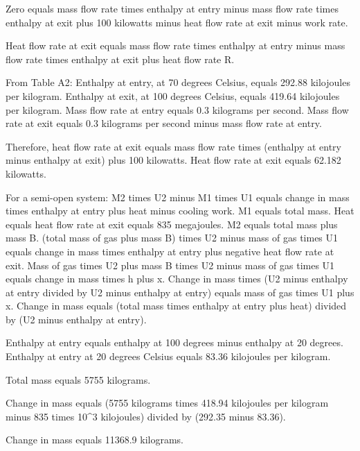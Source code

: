 Zero equals mass flow rate times enthalpy at entry minus mass flow rate times enthalpy at exit plus 100 kilowatts minus heat flow rate at exit minus work rate.

Heat flow rate at exit equals mass flow rate times enthalpy at entry minus mass flow rate times enthalpy at exit plus heat flow rate R.

From Table A2:
Enthalpy at entry, at 70 degrees Celsius, equals 292.88 kilojoules per kilogram.
Enthalpy at exit, at 100 degrees Celsius, equals 419.64 kilojoules per kilogram.
Mass flow rate at entry equals 0.3 kilograms per second.
Mass flow rate at exit equals 0.3 kilograms per second minus mass flow rate at entry.

Therefore, heat flow rate at exit equals mass flow rate times (enthalpy at entry minus enthalpy at exit) plus 100 kilowatts.
Heat flow rate at exit equals 62.182 kilowatts.

For a semi-open system:
M2 times U2 minus M1 times U1 equals change in mass times enthalpy at entry plus heat minus cooling work.
M1 equals total mass.
Heat equals heat flow rate at exit equals 835 megajoules.
M2 equals total mass plus mass B.
(total mass of gas plus mass B) times U2 minus mass of gas times U1 equals change in mass times enthalpy at entry plus negative heat flow rate at exit.
Mass of gas times U2 plus mass B times U2 minus mass of gas times U1 equals change in mass times h plus x.
Change in mass times (U2 minus enthalpy at entry divided by U2 minus enthalpy at entry) equals mass of gas times U1 plus x.
Change in mass equals (total mass times enthalpy at entry plus heat) divided by (U2 minus enthalpy at entry).

Enthalpy at entry equals enthalpy at 100 degrees minus enthalpy at 20 degrees.
Enthalpy at entry at 20 degrees Celsius equals 83.36 kilojoules per kilogram.

Total mass equals 5755 kilograms.

Change in mass equals (5755 kilograms times 418.94 kilojoules per kilogram minus 835 times 10^3 kilojoules) divided by (292.35 minus 83.36).

Change in mass equals 11368.9 kilograms.
